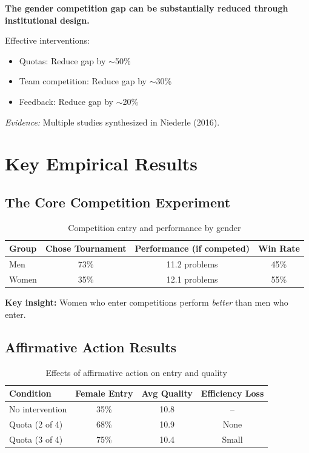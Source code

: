 \begin{tcolorbox}[colback=red!5!white,colframe=red!75!black,title=Axiom MN-6: Institutional Malleability]
\textbf{The gender competition gap can be substantially reduced through institutional design.}

Effective interventions:
\begin{itemize}
    \item Quotas: Reduce gap by $\sim$50\%
    \item Team competition: Reduce gap by $\sim$30\%
    \item Feedback: Reduce gap by $\sim$20\%
\end{itemize}

\textit{Evidence:} Multiple studies synthesized in Niederle (2016).
\end{tcolorbox}

\section{Key Empirical Results}

\subsection{The Core Competition Experiment}

\begin{table}[h]
\centering
\begin{tabular}{lccc}
\hline
\textbf{Group} & \textbf{Chose Tournament} & \textbf{Performance (if competed)} & \textbf{Win Rate} \\
\hline
Men & 73\% & 11.2 problems & 45\% \\
Women & 35\% & 12.1 problems & 55\% \\
\hline
\end{tabular}
\caption{Competition entry and performance by gender}
\end{table}

\textbf{Key insight:} Women who enter competitions perform \textit{better} than men who enter.

\subsection{Affirmative Action Results}

\begin{table}[h]
\centering
\begin{tabular}{lccc}
\hline
\textbf{Condition} & \textbf{Female Entry} & \textbf{Avg Quality} & \textbf{Efficiency Loss} \\
\hline
No intervention & 35\% & 10.8 & -- \\
Quota (2 of 4) & 68\% & 10.9 & None \\
Quota (3 of 4) & 75\% & 10.4 & Small \\
\hline
\end{tabular}
\caption{Effects of affirmative action on entry and quality}
\end{table}

